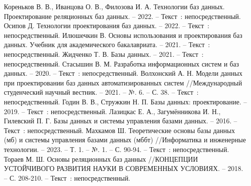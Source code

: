 
\begin{thebibliography}{9}

    \bibitem{} Кореньков В. В., Иванцова О. В., Филозова И. А. Технологии баз данных. Проектирование реляционных баз данных. – 2022. – Текст~: непосредственный.
    \bibitem{} Осипов Д. Технологии проектирования баз данных. – 2022. – Текст~: непосредственный.
    \bibitem{} Илюшечкин В. Основы использования и проектирования баз данных. Учебник для академического бакалавриата. – 2021. – Текст~: непосредственный.
    \bibitem{} Жидченко Т. В. Базы данных. – 2021. – Текст~: непосредственный.
	\bibitem{} Стасышин В. М. Разработка информационных систем и баз данных. – 2020. – Текст~: непосредственный.
	\bibitem{} Волхонский А. Н. Модели данных при проектировании баз данных автоматизированных систем //Международный студенческий научный вестник. – 2021. – №. 6. – С. 38. – Текст~: непосредственный.
	\bibitem{} Годин В. В., Стружкин Н. П. Базы данных: проектирование. – 2019. – Текст~: непосредственный.
	\bibitem{} Лазицкас Е. А., Загумённикова И. Н., Гилевский П. Г. Базы данных и системы управления базами данных. – 2016. – Текст~: непосредственный.
	\bibitem{} Махкамов Ш. Теоретические основы базы данных (мб) и системы управления базами данных (мббт) //Информатика и инженерные технологии. – 2023. – Т. 1. – №. 1. – С. 90-94. – Текст~: непосредственный.    
	\bibitem{} Тораев М. Ш. Основы реляционных баз данных //КОНЦЕПЦИИ УСТОЙЧИВОГО РАЗВИТИЯ НАУКИ В СОВРЕМЕННЫХ УСЛОВИЯХ. – 2018. – С. 208-210. – Текст~: непосредственный.    
	
\end{thebibliography}
